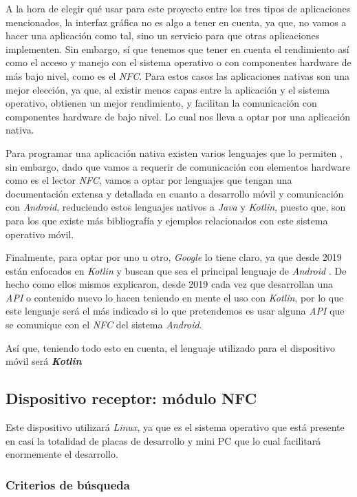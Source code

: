 A la hora de elegir qué usar para este proyecto entre los tres tipos de
aplicaciones mencionados, la interfaz gráfica no es algo a tener en cuenta, ya
que, no vamos a hacer una aplicación como tal, sino un servicio para que otras
aplicaciones implementen. Sin embargo, sí que tenemos que tener en cuenta el
rendimiento así como el acceso y manejo con el sistema operativo o con
componentes hardware de más bajo nivel, como es el \emph{NFC}. Para estos casos las
aplicaciones nativas son una mejor elección, ya que, al existir menos capas entre
la aplicación y el sistema operativo, obtienen un mejor rendimiento, y facilitan
la comunicación con componentes hardware de bajo nivel. Lo cual nos lleva a
optar por una aplicación nativa.

Para programar una aplicación nativa existen varios lenguajes que lo permiten
\cite{lenguajes-nativos}, sin embargo, dado que vamos a requerir de comunicación
con elementos hardware como es el lector \emph{NFC}, vamos a optar por lenguajes
que tengan una documentación extensa y detallada en cuanto a desarrollo móvil y
comunicación con \emph{Android}, reduciendo estos lenguajes nativos a \emph{Java} y
\emph{Kotlin}, puesto que, son para los que existe más bibliografía y ejemplos
relacionados con este sistema operativo móvil.

Finalmente, para optar por uno u otro, \emph{Google} lo tiene claro, ya que desde 2019
están enfocados en \emph{Kotlin} y buscan que sea el principal lenguaje de \emph{Android}
\cite{prioridad-kotlin}. De hecho como ellos mismos explicaron, desde 2019 cada
vez que desarrollan una \emph{API} o contenido nuevo lo hacen teniendo en mente
el uso con \emph{Kotlin}, por lo que este lenguaje será el más indicado si lo que
pretendemos es usar alguna \emph{API} que se comunique con el \emph{NFC} del
sistema \emph{Android}.

Así que, teniendo todo esto en cuenta, el lenguaje utilizado para el
dispositivo móvil será \textbf{\emph{Kotlin}}

\subsection{Dispositivo receptor: módulo NFC}

Este dispositivo utilizará \emph{Linux}, ya que es el sistema operativo que está
presente en casi la totalidad de placas de desarrollo y mini PC que lo cual
facilitará enormemente el desarrollo. 

\subsubsection{Criterios de búsqueda}

